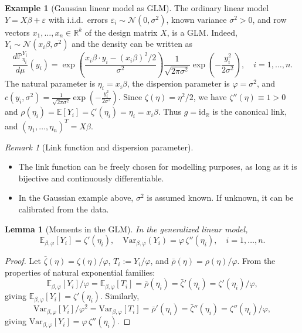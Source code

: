 \documentclass[a4paper,12pt, oneside, fleqn]{book}
\newtheorem{lemma}[theorem]{Lemma}
\theoremstyle{definition}
\newtheorem*{example}{Example}
\theoremstyle{remark}
\newtheorem*{remark}{Remark}
\begin{document}
\begin{example}[Gaussian linear model as GLM]
The ordinary linear model $Y = X\beta + \varepsilon$ with i.i.d.\ errors $\varepsilon_i \sim \mathcal{N}(0, \sigma^2)$, known variance $\sigma^2 > 0$, and row vectors $x_1, \dots, x_n \in \mathbb{R}^k$ of the design matrix $X$, is a GLM. Indeed, $Y_i \sim \mathcal{N}(x_i\beta, \sigma^2)$ and the density can be written as
\begin{equation*}
	\frac{d\mathbb{P}_{\eta_i}^{Y_i}}{d\mu}(y_i) = \exp\!\left(\frac{x_i\beta \cdot y_i - (x_i\beta)^2/2}{\sigma^2}\right) \frac{1}{\sqrt{2\pi\sigma^2}} \exp\!\left(-\frac{y_i^2}{2\sigma^2}\right), \quad i = 1, \dots, n.
\end{equation*}
The natural parameter is $\eta_i = x_i\beta$, the dispersion parameter is $\varphi = \sigma^2$, and $c(y_i, \sigma^2) = \frac{1}{\sqrt{2\pi\sigma^2}} \exp\!\left(-\frac{y_i^2}{2\sigma^2}\right)$. Since $\zeta(\eta) = \eta^2/2$, we have $\zeta''(\eta) \equiv 1 > 0$ and $\rho(\eta_i) = \mathbb{E}[Y_i] = \zeta'(\eta_i) = \eta_i = x_i\beta$. Thus $g = \mathrm{id}_{\mathbb{R}}$ is the canonical link, and $(\eta_1, \dots, \eta_n)^T = X\beta$.
\end{example}

\begin{remark}[Link function and dispersion parameter] ~
\begin{itemize}
	\item The link function can be freely chosen for modelling purposes, as long as it is bijective and continuously differentiable.
	\item In the Gaussian example above, $\sigma^2$ is assumed known. If unknown, it can be calibrated from the data.
\end{itemize}
\end{remark}

\begin{lemma}[Moments in the GLM]
In the generalized linear model,
\begin{equation*}
	\mathbb{E}_{\beta, \varphi}[Y_i] = \zeta'(\eta_i), \quad \mathrm{Var}_{\beta, \varphi}(Y_i) = \varphi \, \zeta''(\eta_i), \quad i = 1, \dots, n.
\end{equation*}
\end{lemma}

\begin{proof}
Let $\bar{\zeta}(\eta) = \zeta(\eta)/\varphi$, $T_i := Y_i / \varphi$, and $\bar{\rho}(\eta) = \rho(\eta)/\varphi$. From the properties of natural exponential families:
\begin{equation*}
	\mathbb{E}_{\beta, \varphi}[Y_i]/\varphi = \mathbb{E}_{\beta, \varphi}[T_i] = \bar{\rho}(\eta_i) = \bar{\zeta}'(\eta_i) = \zeta'(\eta_i)/\varphi,
\end{equation*}
giving $\mathbb{E}_{\beta,\varphi}[Y_i] = \zeta'(\eta_i)$. Similarly,
\begin{equation*}
	\mathrm{Var}_{\beta, \varphi}[Y_i]/\varphi^2 = \mathrm{Var}_{\beta, \varphi}[T_i] = \bar{\rho}'(\eta_i) = \bar{\zeta}''(\eta_i) = \zeta''(\eta_i)/\varphi,
\end{equation*}
giving $\mathrm{Var}_{\beta,\varphi}[Y_i] = \varphi \, \zeta''(\eta_i)$.
\end{proof}
\end{document}
